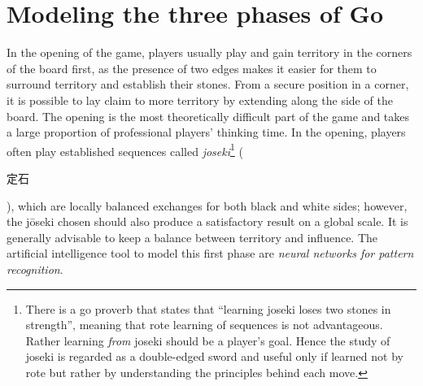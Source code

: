 \section{Modeling the three phases of Go}
In the opening of the game, players usually play and gain territory in the corners of the board first, as the presence of two edges makes it easier for them to surround territory and establish their stones. From a secure position in a corner, it is possible to lay claim to more territory by extending along the side of the board. The opening is the most theoretically difficult part of the game and takes a large proportion of professional players' thinking time. In the opening, players often play established sequences called \emph{joseki}\footnote{There is a go proverb that states that ``learning joseki loses two stones in strength'', meaning that rote learning of sequences is not advantageous. Rather learning \emph{from} joseki should be a player's goal. Hence the study of joseki is regarded as a double-edged sword and useful only if learned not by rote but rather by understanding the principles behind each move.} (\begin{CJK}{UTF8}{min}定石\end{CJK}), which are locally balanced exchanges for both black and white sides; however, the jōseki chosen should also produce a satisfactory result on a global scale. It is generally advisable to keep a balance between territory and influence. The artificial intelligence tool to model this first phase are \emph{neural networks for pattern recognition}.
